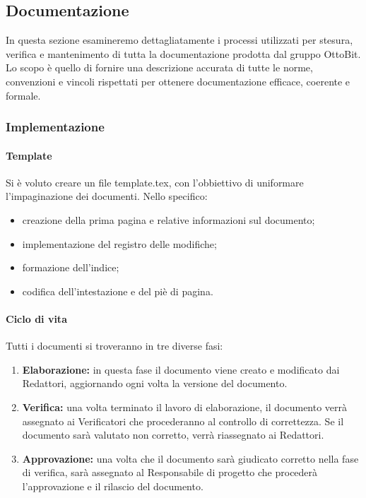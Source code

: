\documentclass[11pt,a4paper]{article}
\begin{document}
{	\subsection{Documentazione}
	In questa sezione esamineremo dettagliatamente i processi utilizzati per stesura, verifica e mantenimento di tutta la documentazione prodotta dal gruppo OttoBit.
	Lo scopo è quello di fornire una descrizione accurata di tutte le norme, convenzioni e vincoli rispettati per ottenere documentazione efficace, coerente e formale.
	\subsubsection{Implementazione}
	
	\paragraph{Template\\}
	Si è voluto creare un file template.tex, con l'obbiettivo di uniformare l'impaginazione dei documenti. 
	Nello specifico:
	\begin{itemize}
		\item{creazione della prima pagina e relative informazioni sul documento;}
		\item{implementazione del registro delle modifiche;}
		\item{formazione dell'indice;}
		\item {codifica dell'intestazione e del piè di pagina.}
		
	\end{itemize}
	
	\paragraph{Ciclo di vita\\}
	Tutti i documenti si troveranno in tre diverse fasi:
	\begin{enumerate}
		\item \textbf{Elaborazione:} in questa fase il documento viene creato e modificato dai Redattori, aggiornando ogni volta la versione del documento. 
		\item \textbf{Verifica:} una volta terminato il lavoro di elaborazione, il documento verrà assegnato ai Verificatori che procederanno al controllo di correttezza. Se il documento sarà valutato non corretto, verrà riassegnato ai Redattori.
		\item \textbf{Approvazione:} una volta che il documento sarà giudicato corretto nella fase di verifica, sarà assegnato al Responsabile di progetto che procederà l'approvazione e il rilascio del documento.
	\end{enumerate}

}
\end{document}
